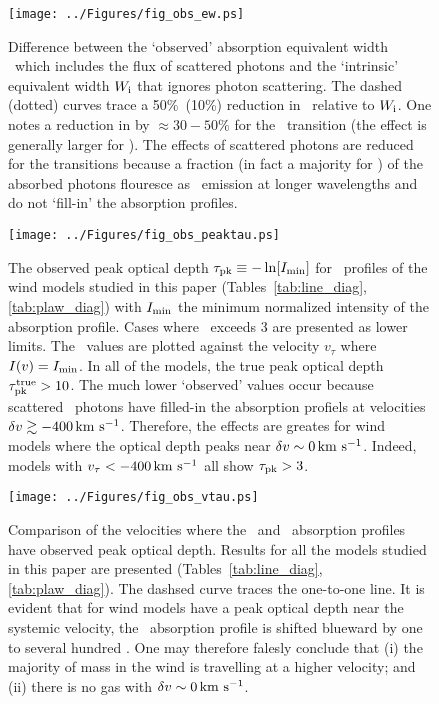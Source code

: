 \documentclass[12pt,preprint]{aastex}
\begin{document}
\begin{figure}
\texttt{[image: ../Figures/fig\_obs\_ew.ps]}
\caption{
Difference between the `observed' absorption equivalent width \ewabs\
which includes the flux of scattered photons and the `intrinsic'
equivalent width $W_{\rm i}$ that ignores photon scattering.  The
dashed (dotted) curves trace a 50\%\ (10\%) reduction in \ewabs\
relative to $W_{\rm i}$.  One notes a reduction in \ewabs by $\approx
30-50\%$ for the \mgiia\ transition (the effect is generally larger
for \mgiib).  The effects of scattered photons are reduced for the
\ion{Fe}{2} transitions because a fraction (in fact a majority for
\feiia) of the absorbed photons flouresce as \feiis\ emission at
longer wavelengths and do not `fill-in' the absorption profiles.
}
\label{fig:obs_ew}
\end{figure}

\begin{figure}
\texttt{[image: ../Figures/fig\_obs\_peaktau.ps]}
\caption{
The observed peak optical depth $\tau_{\rm pk} \equiv -\ln [I_{\rm
  min}]$ for \mgiia\ profiles of the wind models studied in this paper
(Tables~\ref{tab:line_diag}, \ref{tab:plaw_diag}) with $I_{\rm min}$
the minimum normalized intensity of the absorption profile.  Cases
where \tpk\ exceeds 3 are presented as lower limits.  The \tpk\ values
are plotted against the velocity $v_\tau$ where $I(v) = I_{\rm min}$.  In all
of the models, the true peak optical depth $\tau_{\rm pk}^{\rm true} > 10$.
The much lower `observed' values occur because scattered \mgiia\
photons have filled-in the absorption profiels at velocities $\delta v
\gtrsim -400 \, {\rm km~s^{-1}}$.  Therefore, the effects are greates for wind
models where the optical depth peaks near $\delta v \sim 0 \, {\rm km~s^{-1}}$.
Indeed, models with $v_\tau < -400 \, {\rm km~s^{-1}}$ all show $\tau_{\rm pk} > 3$.
}
\label{fig:obs_peaktau}
\end{figure}

\begin{figure}
\texttt{[image: ../Figures/fig\_obs\_vtau.ps]}
\caption{
Comparison of the velocities where the \feiia\ and \mgiia\ absorption
profiles have observed peak optical depth.  Results for all the models
studied in this paper are presented (Tables~\ref{tab:line_diag},
\ref{tab:plaw_diag}).  The dashsed curve traces the one-to-one line.
It is evident that for wind models have a peak optical depth near the
systemic velocity, the \mgiib\ absorption profile is shifted blueward
by one to several hundred \kms.  One may therefore falesly conclude
that (i) the majority of mass in the wind is travelling at a higher
velocity; and (ii) there is no gas with $\delta v \sim 0 \, {\rm km~s^{-1}}$.
}
\label{fig:obs_vtau}
\end{figure}
\end{document}
